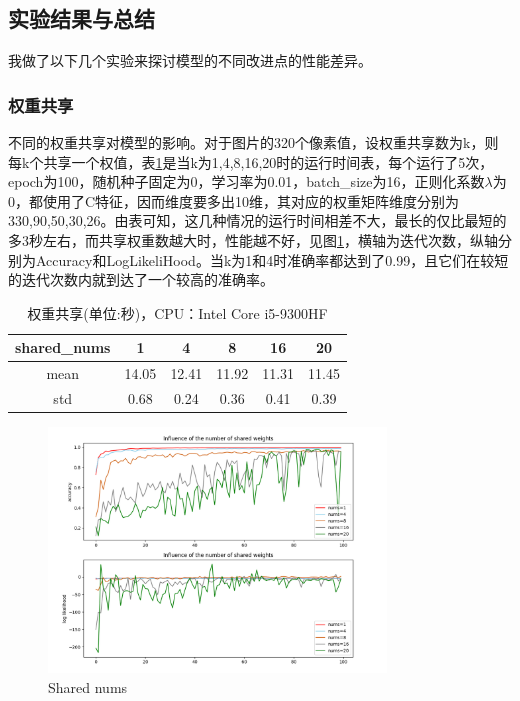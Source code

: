 \documentclass[a4paper,UTF8]{article}
\numberwithin{equation}{section}
\begin{document}
\subsection{实验结果与总结}
我做了以下几个实验来探讨模型的不同改进点的性能差异。
\subsubsection{权重共享}
不同的权重共享对模型的影响。对于图片的320个像素值，设权重共享数为k，则每k个共享一个权值，表\ref{table1}是当k为1,4,8,16,20时的运行时间表，每个运行了5次，epoch为100，随机种子固定为0，学习率为0.01，batch\_size为16，正则化系数$\lambda$为0，都使用了C特征，因而维度要多出10维，其对应的权重矩阵维度分别为330,90,50,30,26。由表可知，这几种情况的运行时间相差不大，最长的仅比最短的多3秒左右，而共享权重数越大时，性能越不好，见图\ref{figure1}，横轴为迭代次数，纵轴分别为Accuracy和LogLikeliHood。当k为1和4时准确率都达到了0.99，且它们在较短的迭代次数内就到达了一个较高的准确率。
\begin{table}
\caption{权重共享(单位:秒)，CPU：Intel Core i5-9300HF}
\label{table1}
\begin{center}
\begin{tabular}{|c|c|c|c|c|c|}
	\hline
	shared\_nums& 1& 4 &8 & 16 & 20\\
	\hline
	mean & 14.05& 12.41 & 11.92& 11.31& 11.45\\
	\hline
	std & 0.68& 0.24& 0.36 & 0.41& 0.39\\
	\hline
\end{tabular}
\end{center}
\end{table}

\begin{figure}[h] 
	\centering
	\includegraphics[width=0.8\textwidth]{figs/Figure_1.png} 
	\caption{Shared nums} 
	\label{figure1}
\end{figure}
\end{document}
